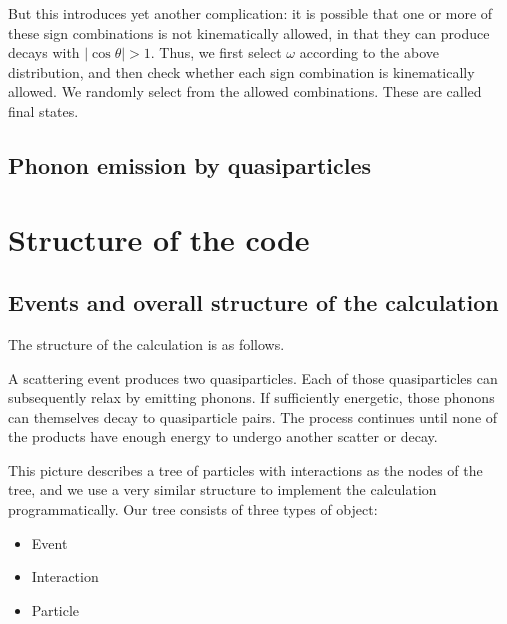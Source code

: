 \documentclass[letterpaper,10pt,english]{sphinxmanual}
\begin{document}
But this introduces yet another complication: it is possible that one or more of these sign combinations is not kinematically allowed, in that they can produce decays with \(|\cos\theta|>1\). Thus, we first select \(\omega\) according to the above distribution, and then check whether each sign combination is kinematically allowed. We randomly select from the allowed combinations. These are called  final states.


\subsection{Phonon emission by quasiparticles}
\label{\detokenize{kinematics:phonon-emission-by-quasiparticles}}

\section{Structure of the code}
\label{\detokenize{code_structure:structure-of-the-code}}\label{\detokenize{code_structure::doc}}

\subsection{Events and overall structure of the calculation}
\label{\detokenize{code_structure:module-scdc.event}}\label{\detokenize{code_structure:events-and-overall-structure-of-the-calculation}}
The structure of the calculation is as follows.

A scattering event produces two quasiparticles. Each of those quasiparticles
can subsequently relax by emitting phonons. If sufficiently energetic, those
phonons can themselves decay to quasiparticle pairs. The process continues
until none of the products have enough energy to undergo another scatter or
decay.

This picture describes a tree of particles with interactions as the nodes of
the tree, and we use a very similar structure to implement the calculation
programmatically. Our tree consists of three types of object:
\begin{itemize}
\item {} 
Event

\item {} 
Interaction

\item {} 
Particle

\end{itemize}
\end{document}
